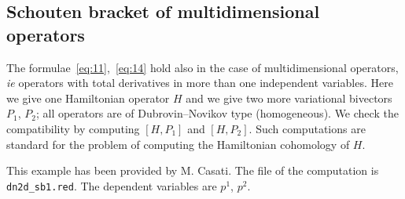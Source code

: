 \subsection{Schouten bracket of multidimensional operators}
\label{cdesec:mult-oper}

The formulae~\eqref{eq:11},~\eqref{eq:14} hold also in the case of
multidimensional operators, \emph{ie} operators with total derivatives in more
than one independent variables. Here we give one Hamiltonian operator $H$ and we
give two more variational bivectors $P_1$, $P_2$; all operators are of
Dubrovin--Novikov type (homogeneous). We check the compatibility
by computing $[H,P_1]$ and $[H,P_2]$. Such computations are standard for the
problem of computing the Hamiltonian cohomology of $H$.

This example has been provided by M. Casati. The file of the computation is
\texttt{dn2d\_sb1.red}. The dependent variables are $p^1$, $p^2$.

